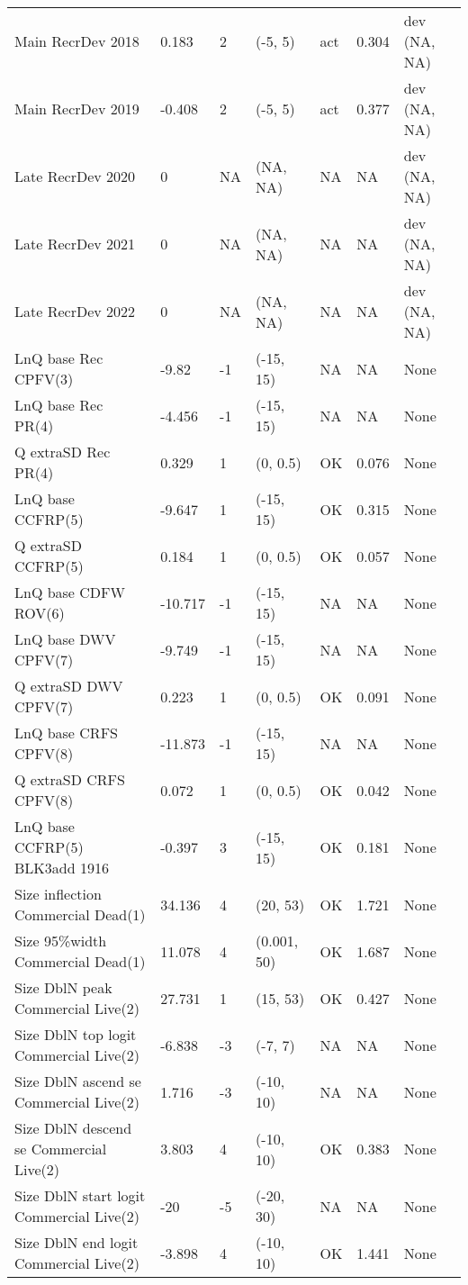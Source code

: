 \documentclass[11pt,
  letterpaper,
]{article}
\begin{document}
\begin{landscape}
\begin{longtable}[t]{>{\raggedright\arraybackslash}p{7.5cm}lllll>{\raggedright\arraybackslash}p{3.5cm}}
Main RecrDev 2018 & 0.183 & 2 & (-5, 5) & act & 0.304 & dev (NA, NA)\\
Main RecrDev 2019 & -0.408 & 2 & (-5, 5) & act & 0.377 & dev (NA, NA)\\
Late RecrDev 2020 & 0 & NA & (NA, NA) & NA & NA & dev (NA, NA)\\
Late RecrDev 2021 & 0 & NA & (NA, NA) & NA & NA & dev (NA, NA)\\
Late RecrDev 2022 & 0 & NA & (NA, NA) & NA & NA & dev (NA, NA)\\
LnQ base Rec CPFV(3) & -9.82 & -1 & (-15, 15) & NA & NA & None\\
LnQ base Rec PR(4) & -4.456 & -1 & (-15, 15) & NA & NA & None\\
Q extraSD Rec PR(4) & 0.329 & 1 & (0, 0.5) & OK & 0.076 & None\\
LnQ base CCFRP(5) & -9.647 & 1 & (-15, 15) & OK & 0.315 & None\\
Q extraSD CCFRP(5) & 0.184 & 1 & (0, 0.5) & OK & 0.057 & None\\
LnQ base CDFW ROV(6) & -10.717 & -1 & (-15, 15) & NA & NA & None\\
LnQ base DWV CPFV(7) & -9.749 & -1 & (-15, 15) & NA & NA & None\\
Q extraSD DWV CPFV(7) & 0.223 & 1 & (0, 0.5) & OK & 0.091 & None\\
LnQ base CRFS CPFV(8) & -11.873 & -1 & (-15, 15) & NA & NA & None\\
Q extraSD CRFS CPFV(8) & 0.072 & 1 & (0, 0.5) & OK & 0.042 & None\\
LnQ base CCFRP(5) BLK3add 1916 & -0.397 & 3 & (-15, 15) & OK & 0.181 & None\\
Size inflection Commercial Dead(1) & 34.136 & 4 & (20, 53) & OK & 1.721 & None\\
Size 95\%width Commercial Dead(1) & 11.078 & 4 & (0.001, 50) & OK & 1.687 & None\\
Size DblN peak Commercial Live(2) & 27.731 & 1 & (15, 53) & OK & 0.427 & None\\
Size DblN top logit Commercial Live(2) & -6.838 & -3 & (-7, 7) & NA & NA & None\\
Size DblN ascend se Commercial Live(2) & 1.716 & -3 & (-10, 10) & NA & NA & None\\
Size DblN descend se Commercial Live(2) & 3.803 & 4 & (-10, 10) & OK & 0.383 & None\\
Size DblN start logit Commercial Live(2) & -20 & -5 & (-20, 30) & NA & NA & None\\
Size DblN end logit Commercial Live(2) & -3.898 & 4 & (-10, 10) & OK & 1.441 & None\\

\end{longtable}
\end{landscape}
\end{document}
